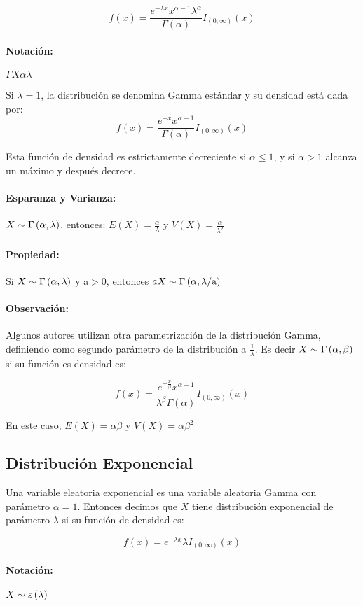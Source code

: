 $$f(x) = \frac{e^{-\lambda x} x^{\alpha-1}\lambda^\alpha}{\Gamma(\alpha)}I_{(0,\infty)}(x)$$

\paragraph{Notación:} $\Gamma{X}{\alpha}{\lambda}$

Si $\lambda=1$, la distribución se denomina Gamma estándar y su densidad está dada por:
$$f(x) = \frac{e^{-x} x^{\alpha-1}}{\Gamma(\alpha)}I_{(0,\infty)}(x)$$

Esta función de densidad es estrictamente decreciente si $\alpha \leq 1$, y si $\alpha > 1$ alcanza un máximo y después decrece.

\paragraph{Esparanza y Varianza:}
$X\sim \Gamma\left(\alpha,\lambda\right)$, entonces: $E(X) =\frac{\alpha}{\lambda}$ y $V(X) = \frac{\alpha}{\lambda^2}$

\paragraph{Propiedad: } Si $X\sim \Gamma\left(\alpha,\lambda\right)$ y a$>0$, entonces $aX\sim \Gamma\left(\alpha,\lambda /\text{a}\right)$

\paragraph{Observación:} Algunos autores utilizan otra parametrización de la distribución Gamma, definiendo como segundo parámetro de la distribución a $\frac{1}{\lambda}$. Es decir $X\sim \Gamma\left(\alpha,\beta\right)$ si su función es densidad es:

$$f(x) = \frac{e^{-\frac{x}{\beta}} x^{\alpha-1}}{\lambda^\beta\Gamma(\alpha)}I_{(0,\infty)}(x)$$

En este caso, $E(X) = \alpha\beta$ y $V(X) = \alpha\beta^2$
\subsection{Distribución Exponencial}
Una variable eleatoria exponencial es una variable aleatoria Gamma con parámetro $\alpha = 1$. Entonces decimos que $X$ tiene distribución exponencial de parámetro $\lambda$ si su función de densidad es:

$$f(x) = e^{-\lambda x} \lambda I_{(0,\infty)}(x)$$

\paragraph{Notación:} $X\sim \varepsilon\left(\lambda\right)$
